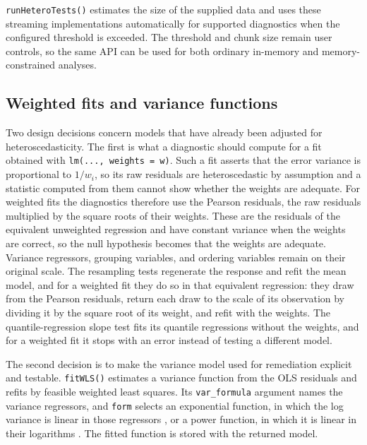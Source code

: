 \texttt{runHeteroTests()} estimates the size of the supplied data and uses these
streaming implementations automatically for supported diagnostics when the
configured threshold is exceeded. The threshold and chunk size remain user
controls, so the same API can be used for both ordinary in-memory and
memory-constrained analyses.

\subsection{Weighted fits and variance functions}\label{weighted-fits-and-variance-functions}

Two design decisions concern models that have already been adjusted for
heteroscedasticity. The first is what a diagnostic should compute for a fit
obtained with \texttt{lm(...,\ weights\ =\ w)}. Such a fit asserts that the error
variance is proportional to \(1/w_i\), so its raw residuals are
heteroscedastic by assumption and a statistic computed from them cannot show
whether the weights are adequate. For weighted fits the diagnostics therefore
use the Pearson residuals, the raw residuals multiplied by the square roots of
their weights. These are the residuals of the equivalent unweighted regression
and have constant variance when the weights are correct, so the null
hypothesis becomes that the weights are adequate. Variance regressors,
grouping variables, and ordering variables remain on their original scale.
The resampling tests regenerate the response and refit the mean model, and
for a weighted fit they do so in that equivalent regression: they draw from the
Pearson residuals, return each draw to the scale of its observation by
dividing it by the square root of its weight, and refit with the weights. The
quantile-regression slope test fits its quantile regressions without the
weights, and for a weighted fit it stops with an error instead of testing a
different model.

The second decision is to make the variance model used for remediation
explicit and testable. \texttt{fitWLS()} estimates a variance function from the OLS
residuals and refits by feasible weighted least squares. Its \texttt{var\_formula}
argument names the variance regressors, and \texttt{form} selects an exponential
function, in which the log variance is linear in those regressors
\citep{harvey1976estimating}, or a power function, in which it is linear in their
logarithms \citep{park1966estimation}. The fitted function is stored with the
returned model.

